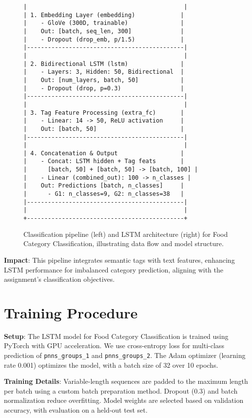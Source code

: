 \documentclass[11pt]{article}
\begin{document}
\begin{figure}[H]
\begin{minipage}{0.48\textwidth}
\begin{lstlisting}[basicstyle=\ttfamily\scriptsize,breaklines=true,columns=flexible,frame=single,xleftmargin=0pt]
|                                             |
| 1. Embedding Layer (embedding)             |
|    - GloVe (300D, trainable)               |
|    Out: [batch, seq_len, 300]              |
|    - Dropout (drop_emb, p/1.5)             |
|---------------------------------------------|
|                                             |
| 2. Bidirectional LSTM (lstm)               |
|    - Layers: 3, Hidden: 50, Bidirectional  |
|    Out: [num_layers, batch, 50]            |
|    - Dropout (drop, p=0.3)                 |
|---------------------------------------------|
|                                             |
| 3. Tag Feature Processing (extra_fc)       |
|    - Linear: 14 -> 50, ReLU activation     |
|    Out: [batch, 50]                        |
|---------------------------------------------|
|                                             |
| 4. Concatenation & Output                  |
|    - Concat: LSTM hidden + Tag feats       |
|      [batch, 50] + [batch, 50] -> [batch, 100] |
|    - Linear (combined_out): 100 -> n_classes |
|    Out: Predictions [batch, n_classes]     |
|      - G1: n_classes=9, G2: n_classes=38   |
|---------------------------------------------|
|                                             |
+---------------------------------------------+
\end{lstlisting}
\end{minipage}
\caption{Classification pipeline (left) and LSTM architecture (right) for Food Category Classification, illustrating data flow and model structure.}
\label{fig:classification_pipeline_model}
\end{figure}

\textbf{Impact}: This pipeline integrates semantic tags with text features, enhancing LSTM performance for imbalanced category prediction, aligning with the assignment’s classification objectives.



\section{Training Procedure}

\textbf{Setup}: The LSTM model for Food Category Classification is trained using PyTorch with GPU acceleration. We use cross-entropy loss for multi-class prediction of \texttt{pnns\_groups\_1} and \texttt{pnns\_groups\_2}. The Adam optimizer (learning rate 0.001) optimizes the model, with a batch size of 32 over 10 epochs.

\textbf{Training Details}: Variable-length sequences are padded to the maximum length per batch using a custom batch preparation method. Dropout (0.3) and batch normalization reduce overfitting. Model weights are selected based on validation accuracy, with evaluation on a held-out test set.
\end{document}
